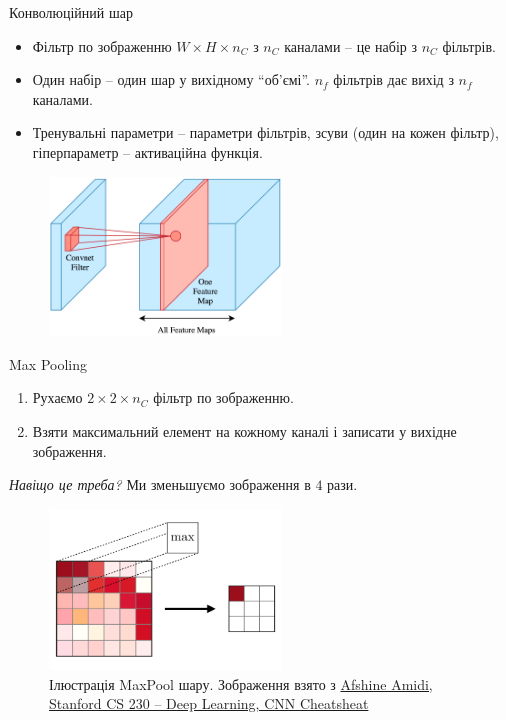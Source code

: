 \documentclass{zkdl-presentation-template}
\begin{document}
    \begin{frame}{Конволюційний шар}
        \begin{itemize}
            \item Фільтр по зображенню $W \times H \times n_C$ з $n_C$ каналами -- це набір з $n_C$ фільтрів.
            \item Один набір -- один шар у вихідному ``об'ємі''. $n_f$ фільтрів дає вихід з $n_f$ каналами.
            \item Тренувальні параметри -- параметри фільтрів, зсуви (один на кожен фільтр), гіперпараметр -- активаційна функція.
        \end{itemize}        

        \begin{figure}
        \centering
            \includegraphics[width=0.55\textwidth]{images/cnn_volume.png}
        \end{figure}
    \end{frame}
	
    \begin{frame}{Max Pooling}
        \begin{enumerate}
            \item Рухаємо $2\times 2 \times n_C$ фільтр по зображенню. 
            \item Взяти максимальний елемент на кожному каналі і записати у вихідне зображення.
        \end{enumerate}

        \textit{Навіщо це треба?} Ми зменьшуємо зображення в $4$ рази.

        \begin{figure}
        \centering
            \includegraphics[width=0.55\textwidth]{images/max-pooling-a.png}
            \caption{Ілюстрація MaxPool шару. \scriptsize Зображення взято з \href{https://stanford.edu/~shervine/teaching/cs-230/cheatsheet-convolutional-neural-networks}{Afshine Amidi, Stanford CS 230 -- Deep Learning, CNN Cheatsheat}}
        \end{figure}
    \end{frame}
\end{document}
